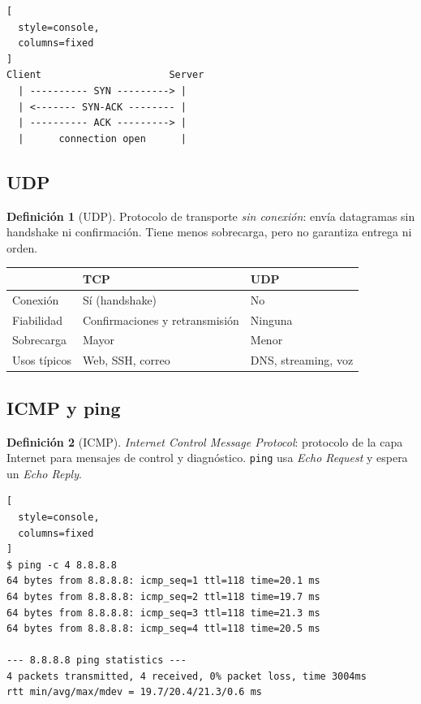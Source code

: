 \documentclass[11pt,a4paper]{article}
\theoremstyle{definition}
\newtheorem{definicion}{Definición}[section]
\theoremstyle{remark}
\newcommand{\cmd}[1]{\texttt{#1}}
\begin{document}
\begin{lstlisting}[
  style=console,
  columns=fixed
]
Client                      Server
  | ---------- SYN ---------> |
  | <------- SYN-ACK -------- |
  | ---------- ACK ---------> |
  |      connection open      |
\end{lstlisting}

\subsection{UDP}

\begin{definicion}[UDP]
Protocolo de transporte \emph{sin conexión}: envía datagramas sin handshake ni confirmación. Tiene menos sobrecarga, pero no garantiza entrega ni orden.
\end{definicion}

\begin{center}
\begin{tabular}{@{}p{3.2cm}p{5.5cm}p{5.5cm}@{}}
\toprule
 & \textbf{TCP} & \textbf{UDP}\\
\midrule
Conexión & Sí (handshake) & No\\
Fiabilidad & Confirmaciones y retransmisión & Ninguna\\
Sobrecarga & Mayor & Menor\\
Usos típicos & Web, SSH, correo & DNS, streaming, voz\\
\bottomrule
\end{tabular}
\end{center}

\subsection{ICMP y ping}

\begin{definicion}[ICMP]
\emph{Internet Control Message Protocol}: protocolo de la capa Internet para mensajes de control y diagnóstico. \cmd{ping} usa \emph{Echo Request} y espera un \emph{Echo Reply}.
\end{definicion}

\begin{lstlisting}[
  style=console,
  columns=fixed
]
$ ping -c 4 8.8.8.8
64 bytes from 8.8.8.8: icmp_seq=1 ttl=118 time=20.1 ms
64 bytes from 8.8.8.8: icmp_seq=2 ttl=118 time=19.7 ms
64 bytes from 8.8.8.8: icmp_seq=3 ttl=118 time=21.3 ms
64 bytes from 8.8.8.8: icmp_seq=4 ttl=118 time=20.5 ms

--- 8.8.8.8 ping statistics ---
4 packets transmitted, 4 received, 0% packet loss, time 3004ms
rtt min/avg/max/mdev = 19.7/20.4/21.3/0.6 ms
\end{lstlisting}
\end{document}
